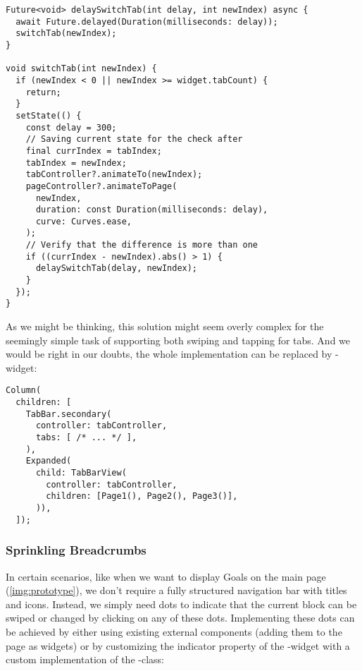 \begin{lstlisting}
Future<void> delaySwitchTab(int delay, int newIndex) async {
  await Future.delayed(Duration(milliseconds: delay));
  switchTab(newIndex);
}

void switchTab(int newIndex) {
  if (newIndex < 0 || newIndex >= widget.tabCount) {
    return;
  }
  setState(() {
    const delay = 300;
    // Saving current state for the check after 
    final currIndex = tabIndex;
    tabIndex = newIndex;
    tabController?.animateTo(newIndex);
    pageController?.animateToPage(
      newIndex,
      duration: const Duration(milliseconds: delay),
      curve: Curves.ease,
    );
    // Verify that the difference is more than one
    if ((currIndex - newIndex).abs() > 1) {
      delaySwitchTab(delay, newIndex);
    }
  });
}
\end{lstlisting}

\noindent As we might be thinking, this solution might seem overly complex for the seemingly simple task of supporting 
both swiping and tapping for tabs. And we would be right in our doubts, the whole implementation can be replaced by 
-widget:

\begin{lstlisting}
Column(
  children: [
    TabBar.secondary(
      controller: tabController,
      tabs: [ /* ... */ ],
    ),
    Expanded(
      child: TabBarView(
        controller: tabController,
        children: [Page1(), Page2(), Page3()],
      )),
  ]);
\end{lstlisting}

\subsubsection{Sprinkling Breadcrumbs}

In certain scenarios, like when we want to display Goals on the main page (\cref{img:prototype}), we don't require a 
fully structured navigation bar with titles and icons. Instead, we simply need dots to indicate that the current block 
can be swiped or changed by clicking on any of these dots. Implementing these dots can be achieved by either using 
existing external components (adding them to the page as widgets) or by customizing the indicator property of the 
-widget with a custom implementation of the -class:

